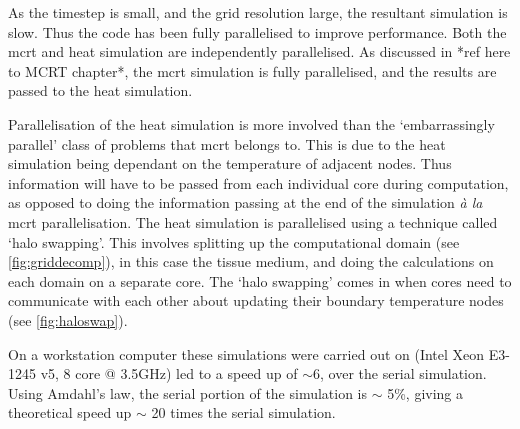 As the timestep is small, and the grid resolution large, the resultant simulation is slow. Thus the code has been fully parallelised to improve performance. Both the \gls{mcrt} and heat simulation are independently parallelised. As discussed in *ref here to MCRT chapter*, the \gls{mcrt} simulation is fully parallelised, and the results are passed to the heat simulation.

\medskip

Parallelisation of the heat simulation is more involved than the `embarrassingly parallel' class of problems that \gls{mcrt} belongs to. This is due to the heat simulation being dependant on the temperature of adjacent nodes. Thus information will have to be passed from each individual core during computation, as opposed to doing the information passing at the end of the simulation \textit{\`a la} \gls{mcrt} parallelisation.
The heat simulation is parallelised using a technique called `halo swapping'. This involves splitting up the computational domain (see \cref{fig:griddecomp}), in this case the tissue medium, and doing the calculations on each domain on a separate core. The `halo swapping' comes in when cores need to communicate with each other about updating their boundary temperature nodes (see \cref{fig:haloswap}).

On a workstation computer these simulations were carried out on (Intel Xeon E3-1245 v5, 8 core @ 3.5GHz) led to a speed up of $\sim$6, over the serial simulation. Using Amdahl's law\cite{amdahl1967validity}, the serial portion of the simulation is $\sim$ 5\%, giving a theoretical speed up $\sim$ 20 times the serial simulation.


